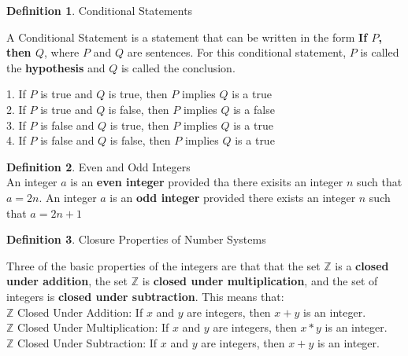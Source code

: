 \documentclass{book}
\theoremstyle{definition}
\newtheorem{definition}{Definition}[section]
\theoremstyle{remark}
\newcommand{\bb}[1]{\mathbb{#1}}
\begin{document}
\begin{definition}
Conditional Statements

A Conditional Statement is a statement that can be written in the form {\bf If $P$, then $Q$}, where $P$ and $Q$ are sentences. For this conditional statement, $P$ is called the {\bf hypothesis} and $Q$ is called the conclusion. \\

\begin{minipage}{1\textwidth}
1. If $P$ is true and $Q$ is true, then $P$ implies $Q$ is a true \\
2. If $P$ is true and $Q$ is false, then $P$ implies $Q$ is a false \\
3. If $P$ is false and $Q$ is true, then $P$ implies $Q$ is a true \\
4. If $P$ is false and $Q$ is false, then $P$ implies $Q$ is a true \\
\end{minipage}
\end{definition}

\begin{definition}
Even and Odd Integers \\

An integer $a$ is an {\bf even integer} provided tha there exisits an integer $n$ such that $a = 2n$. An integer $a$ is an {\bf odd integer} provided there exists an integer $n$ such that $a = 2n + 1$
\end{definition}


\begin{definition}
Closure Properties of Number Systems

Three of the basic properties of the integers are that that the set $\bb{Z}$ is a {\bf closed under addition}, the set $\bb{Z}$ is {\bf closed under multiplication}, and the set of integers is {\bf closed under subtraction}. This means that: \\

$\bb{Z}$ Closed Under Addition: If $x$ and $y$ are integers, then $x+y$ is an integer. \\
 
$\bb{Z}$ Closed Under Multiplication: If $x$ and $y$ are integers, then $x*y$ is an integer. \\

$\bb{Z}$ Closed Under Subtraction: If $x$ and $y$ are integers, then $x+y$ is an integer. \\

\end{definition}
\end{document}
